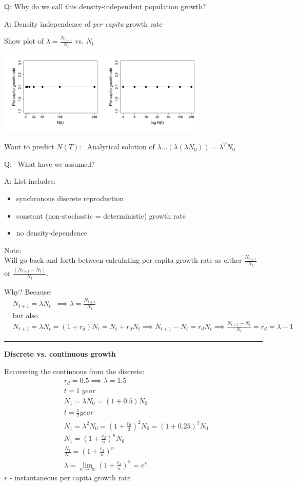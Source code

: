 \documentclass{article}
\newcommand{\note}[1]{\colorbox{gray!20}{#1}}
\newcommand*\circled[1]{\tikz[baseline=(char.base)]{
            \node[shape=circle,draw,inner sep=2pt] (char) {#1};}}
\begin{document}
\note{Q:} Why do we call this density-independent population growth? 

\note{A:} Density independence of \emph{per capita} growth rate

\note{Show plot of $\lambda=\frac{N_{t+1}}{N_t}$ vs. $N_t$}
\begin{center}
\includegraphics[width=10cm]{figs/image1}
\end{center}
Want to predict $N(T)$:  Analytical solution of $\lambda...(\lambda(\lambda N_0)) = \lambda^T N_0$


\note{Q:}  What have we assumed?

\note{A:}	List includes:
\begin{itemize}
	\item	synchronous discrete reproduction
	\item	constant (non-stochastic = deterministic) growth rate
	\item	no density-dependence
\end{itemize}

Note:\\
Will go back and forth between calculating per capita growth rate as either $\frac{N_{t+1}}{N_t}$ or $\frac{(N_{t+1}-N_t)}{N_t}$.

Why? Because:
\begin{align*}
& N_{t+1} =\lambda N_t \;\; 
\implies \lambda = \frac{N_{t+1}}{N_t}\\
& \text{but also}  \\ 
& N_{t+1}=\lambda N_t = (1+r_d)N_t = N_t + r_d N_t
\implies N_{t+1}-N_t = r_d N_t
\implies \frac{N_{t+1}-N_t}{N_t}=r_d = \lambda -1
\end{align*}

\rule[0.5ex]{\linewidth}{1pt}

\break

\circled{2}
\textbf{Discrete vs. continuous growth}

Recovering the continuous from the discrete:
\begin{align*}
	& r_d=0.5 \implies \lambda=1.5 \\ 
	& t=1 \; year\\
	& N_1 = \lambda N_0=(1+0.5)N_0\\[1.5em]
	& t=\frac{1}{2} year \\
	& N_1 = \lambda^2 N_0 = \left(1+\tfrac{r_d}{2}\right)^2 N_0 = (1+0.25)^2 N_0 \\[1.5em]
	& N_1 = \left(1+\tfrac{r_d}{n}\right)^n N_0\\
	& \frac{N_1}{N_0}=\left(1+\tfrac{r_d}{n}\right)^n\\[1.5em]
	& \lambda = \lim_{n \to \infty}\left(1+\tfrac{r_d}{n}\right)^n = e^r 
\end{align*}
$r$ - instantaneous per capita growth rate
\end{document}
